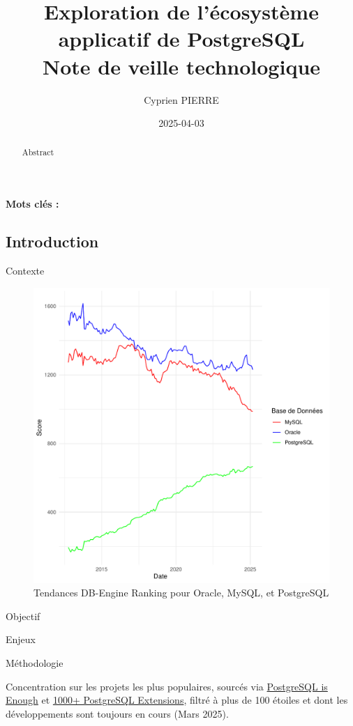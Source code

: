 \documentclass[a4paper,12pt]{article}
\author{Cyprien PIERRE \orcidlink{0009-0009-9040-6795}}
\date{2025-04-03}
\title{Exploration de l'écosystème applicatif de PostgreSQL\\\medskip
\large Note de veille technologique}
\begin{document}
\maketitle
\begin{abstract}
Abstract
\end{abstract}

\textbf{Mots clés : }

\begin{multicols*}{2}
\section*{Introduction}
\label{sec:orgb64e2d5}
Contexte

\begin{figure}[H]
\centering
\includegraphics[width=.9\linewidth]{charts/top5.pdf}
\caption{\label{fig:orgeeed9f2}Tendances DB-Engine Ranking pour Oracle, MySQL, et PostgreSQL}
\end{figure} 

Objectif 

Enjeux

Méthodologie

Concentration sur les projets les plus populaires, sourcés via \href{https://gist.github.com/cpursley/c8fb81fe8a7e5df038158bdfe0f06dbb}{PostgreSQL is Enough} et \href{https://gist.github.com/joelonsql/e5aa27f8cc9bd22b8999b7de8aee9d47}{1000+ PostgreSQL Extensions}, filtré à plus de 100 étoiles et dont les développements sont toujours en cours (Mars 2025).

\end{multicols*}
\end{document}
